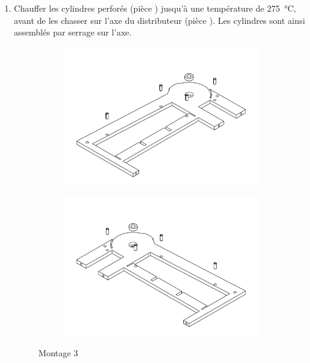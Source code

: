\begin{enumerate}
\item  Chauffer les cylindres perforés (pièce ) jusqu'à une température de \SI{275}{\degreeCelsius}, avant de les chasser sur l'axe du distributeur (pièce ). Les cylindres sont ainsi assemblés par serrage sur l'axe.

\newpage

\begin{figure}
    \centering
    \begin{subfigure}[h]{0.45\linewidth}
        \centerfloat
        \includegraphics[width=1.25\linewidth]{Graphics/Montage/3A.pdf}
    \end{subfigure}
    \hfill
    \begin{subfigure}[h]{0.45\linewidth}
        \centerfloat
        \includegraphics[width=1.25\linewidth]{Graphics/Montage/3B.pdf}
    \end{subfigure}
    \caption{Montage 3}
    \label{fig:Montage3}
\end{figure}


\end{enumerate}
